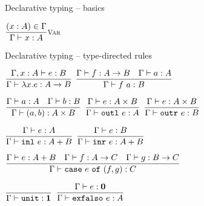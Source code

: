 \documentclass{beamer}
\newcommand{\Fun}[2]{#1 \to #2}
\newcommand{\Prod}[2]{#1 \times #2}
\newcommand{\Sum}[2]{#1 + #2}
\newcommand{\Unit}{\textbf{1}}
\newcommand{\Empty}{\textbf{0}}
\newcommand{\fun}[2]{\lambda #1. #2}
\newcommand{\app}[2]{#1\ #2}
\newcommand{\pair}[2]{(#1, #2)}
\newcommand{\outl}[1]{\texttt{outl}\ #1}
\newcommand{\outr}[1]{\texttt{outr}\ #1}
\newcommand{\inl}[1]{\texttt{inl}\ #1}
\newcommand{\inr}[1]{\texttt{inr}\ #1}
\newcommand{\case}[3]{\texttt{case}\ #1\ \texttt{of}\ (#2, #3)}
\newcommand{\unit}{\texttt{unit}}
\newcommand{\exfalso}[1]{\texttt{exfalso}\ #1}
\newcommand{\fulltyping}[3]{#1 \vdash #2 : #3}
\newcommand{\typing}[2]{\fulltyping{\Gamma}{#1}{#2}}
\newcommand{\rulename}[1]{\textsc{\footnotesize{#1}}}
\newcommand{\infrule}[3][]{\displaystyle \frac{#2}{#3} \rulename{#1}}
\newcommand{\extend}[3]{#1, #2 : #3}
\newcommand{\sidecond}[1]{#1}
\begin{document}
\begin{frame}{Declarative typing -- basics}

\begin{center}
  $\infrule[Var]{\sidecond{(x : A) \in \Gamma}}{\typing{x}{A}}$
\end{center}

\end{frame}

\begin{frame}{Declarative typing -- type-directed rules}

\begin{center}
  $\infrule{\fulltyping{\extend{\Gamma}{x}{A}}{e}{B}}{\typing{\fun{x}{e}}{\Fun{A}{B}}}$ \quad
  $\infrule{\typing{f}{\Fun{A}{B}} \quad \typing{a}{A}}{\typing{\app{f}{a}}{B}}$

  \vspace{2em}

  $\infrule{\typing{a}{A} \quad \typing{b}{B}}{\typing{\pair{a}{b}}{\Prod{A}{B}}}$ \quad
  $\infrule{\typing{e}{\Prod{A}{B}}}{\typing{\outl{e}}{A}}$ \quad
  $\infrule{\typing{e}{\Prod{A}{B}}}{\typing{\outr{e}}{B}}$

  \vspace{2em}

  $\infrule{\typing{e}{A}}{\typing{\inl{e}}{\Sum{A}{B}}}$ \quad
  $\infrule{\typing{e}{B}}{\typing{\inr{e}}{\Sum{A}{B}}}$

  \vspace{2em}

  $\infrule{\typing{e}{\Sum{A}{B}} \quad \typing{f}{\Fun{A}{C}} \quad \typing{g}{\Fun{B}{C}}}{\typing{\case{e}{f}{g}}{C}}$

  \vspace{2em}

  $\infrule{}{\typing{\unit}{\Unit}}$ \quad
  $\infrule{\typing{e}{\Empty}}{\typing{\exfalso{e}}{A}}$
\end{center}

\end{frame}
\end{document}
